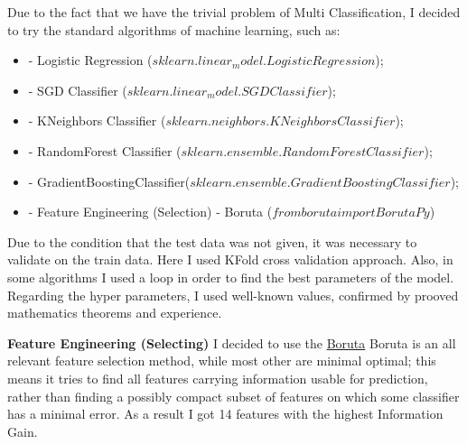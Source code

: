 \documentclass[12pt]{article}
\begin{document}
Due to the fact that we have the trivial problem of Multi Classification, I decided to try the standard algorithms of machine learning, such as:
\begin{itemize}
  \item - Logistic Regression ($sklearn.linear_model.LogisticRegression$);
  \item - SGD Classifier ($sklearn.linear_model.SGDClassifier$);
  \item - KNeighbors Classifier ($sklearn.neighbors.KNeighborsClassifier$);
  \item - RandomForest Classifier ($ sklearn.ensemble.RandomForestClassifier$);
  \item - GradientBoostingClassifier($sklearn.ensemble.GradientBoostingClassifier$);
  \item - Feature Engineering (Selection) - Boruta ($from boruta import BorutaPy$)
  \end{itemize}\newline
  Due to the condition that the test data was not given, it was necessary to validate on the train data. Here I used KFold cross validation approach. Also, in some algorithms I used a loop in order to find the best parameters of the model. Regarding the hyper parameters, I used well-known values, confirmed by prooved mathematics theorems and experience.\newline

\textbf{Feature Engineering (Selecting)}\newline 
I decided to use the \href{https://github.com/scikit-learn-contrib/boruta_py}{Boruta}\newline
Boruta is an all relevant feature selection method, while most other are minimal optimal; this means it tries to find all features carrying information usable for prediction, rather than finding a possibly compact subset of features on which some classifier has a minimal error.\newline
As a result I got 14 features with the highest Information Gain. \newline
\end{document}
